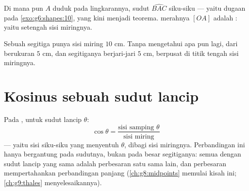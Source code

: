 \begin{omfigure}

{\small Di mana pun $A$ duduk pada lingkarannya, sudut $\widehat{BAC}$
siku-siku --- yaitu dugaan pada \cref{exo:g6:shapes:10}, yang kini
menjadi teorema.  merahnya $[OA]$ adalah : yaitu
setengah sisi miringnya.}
\end{omfigure}

\begin{example}\label{ex:g8:cosine:circle}
Sebuah segitiga punya sisi miring $10$ cm. Tanpa mengetahui apa pun
lagi,  dari  berukuran $5$ cm, dan
 segitiganya berjari-jari $5$ cm, berpusat di
titik tengah sisi miringnya.
\end{example}

\section{Kosinus sebuah sudut lancip}

\begin{definition}[Kosinus]\label{def:g8:cosine:def}
Pada , untuk sudut lancip $\theta$:
\[
\cos\theta = \frac{\text{sisi samping } \theta}{\text{sisi miring}}
\]
--- yaitu sisi siku-siku yang menyentuh $\theta$, dibagi sisi
miringnya. Perbandingan ini hanya bergantung pada sudutnya, bukan pada
besar segitiganya: semua  dengan sudut lancip yang
sama adalah perbesaran satu sama lain, dan perbesaran mempertahankan
perbandingan panjang (\cref{ch:g8:midpoints} memulai kisah ini;
\cref{ch:g9:thales} menyelesaikannya).
\end{definition}

